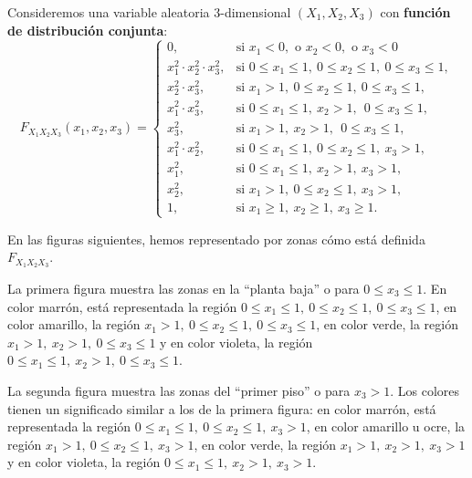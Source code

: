 \documentclass[]{book}
\begin{document}
Consideremos una variable aleatoria \(3\)-dimensional \((X_1,X_2,X_3)\) con \textbf{función de distribución conjunta}:
\[
F_{X_1X_2X_3}(x_1,x_2,x_3)=\begin{cases}
0, & \mbox{si }x_1<0,\mbox{ o }x_2<0,\mbox{ o }x_3 <0\\
x_1^2\cdot x_2^2\cdot x_3^2, & \mbox{si }0\leq x_1\leq 1,\ 0\leq x_2\leq 1,\ 0\leq x_3\leq 1, \\
 x_2^2\cdot x_3^2, & \mbox{si }x_1> 1,\ 0\leq x_2\leq  1,\ 0\leq x_3\leq  1, \\
 x_1^2\cdot x_3^2, & \mbox{si }0\leq x_1\leq  1,\ x_2> 1,\ \ 0\leq x_3\leq  1, \\
 x_3^2, & \mbox{si }x_1> 1,\ x_2> 1,\ \ 0\leq x_3\leq  1, \\
 x_1^2\cdot x_2^2, & \mbox{si }0\leq x_1\leq  1,\ 0\leq x_2\leq  1,\ x_3> 1,\\
 x_1^2, & \mbox{si }0\leq x_1\leq  1,\ x_2 >  1,\ x_3> 1,\\
 x_2^2, & \mbox{si }x_1>1,\ 0\leq x_2\leq  1,\ x_3> 1,\\
1, & \mbox{si }x_1\geq 1,\ x_2\geq 1,\ x_3\geq 1.
\end{cases}
\]

En las figuras siguientes, hemos representado por zonas cómo está definida \(F_{X_1X_2X_3}\).

La primera figura muestra las zonas en la ``planta baja'' o para \(0\leq x_3\leq 1\).
En color marrón, está representada la región \(0\leq x_1\leq 1,\ 0\leq x_2\leq 1,\ 0\leq x_3\leq 1\), en color amarillo, la región \(x_1> 1,\ 0\leq x_2\leq 1,\ 0\leq x_3\leq 1\), en color verde, la región \(x_1>1,\ x_2>1,\ 0\leq x_3\leq 1\) y en color violeta, la región \(0\leq x_1\leq 1,\ x_2>1,\ 0\leq x_3\leq 1\).

La segunda figura muestra las zonas del ``primer piso'' o para \(x_3>1\). Los colores tienen un significado similar a los de la primera figura: en color marrón, está representada la región \(0\leq x_1\leq 1,\ 0\leq x_2\leq 1,\  x_3> 1\), en color amarillo u ocre, la región \(x_1> 1,\ 0\leq x_2\leq 1,\ x_3> 1\), en color verde, la región \(x_1>1,\ x_2>1,\ x_3> 1\) y en color violeta, la región \(0\leq x_1\leq 1,\ x_2>1,\ x_3> 1\).
\end{document}
